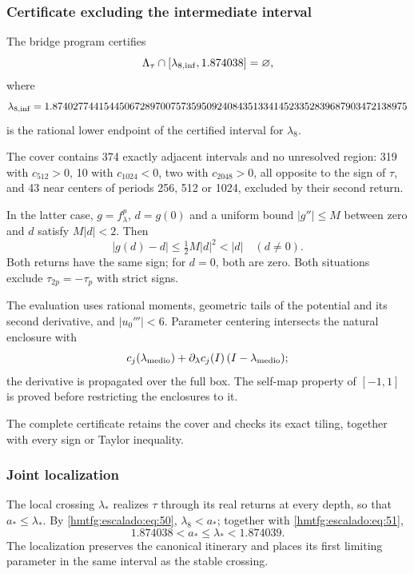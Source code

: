 \subsubsection{Certificate excluding the intermediate interval}
\label{hmtfg:escalado:15.3}

The bridge program certifies
\begin{equation}
\Lambda_\tau\cap[\lambda_{8,\rm inf},1.874038]=\varnothing,
\label{hmtfg:escalado:eq:51}
\end{equation}
where
\[
\lambda_{8,\rm inf}
=1.874027744154450672897007573595092408435133414523352839687903472138975
\]
is the rational lower endpoint of the certified interval for \(\lambda_8\).

The cover contains 374 exactly adjacent intervals and no unresolved region: 319 with \(c_{512}>0\), 10 with \(c_{1024}<0\), two with \(c_{2048}>0\), all opposite to the sign of \(\tau\), and 43 near centers of periods 256, 512 or 1024, excluded by their second return.

In the latter case, \(g=f_\lambda^p\), \(d=g(0)\) and a uniform bound \(|g''|\le M\) between zero and \(d\) satisfy \(M|d|<2\). Then
\[
|g(d)-d|\le\tfrac12M|d|^2<|d|\quad(d\ne0).
\]
Both returns have the same sign; for \(d=0\), both are zero. Both situations exclude \(\tau_{2p}=-\tau_p\) with strict signs.

The evaluation uses rational moments, geometric tails of the potential and its second derivative, and \(|u_0'''|<6\). Parameter centering intersects the natural enclosure with
\[
c_j(\lambda_{\rm medio})+
\partial_\lambda c_j(I)\,(I-\lambda_{\rm medio});
\]
the derivative is propagated over the full box. The self-map property of \([-1,1]\) is proved before restricting the enclosures to it.

The complete certificate retains the cover and checks its exact tiling, together with every sign or Taylor inequality.

\subsubsection{Joint localization}
\label{hmtfg:escalado:15.4}

The local crossing \(\lambda_*\) realizes \(\tau\) through its real returns at every depth, so that \(a_*\le\lambda_*\). By \eqref{hmtfg:escalado:eq:50}, \(\lambda_8<a_*\); together with \eqref{hmtfg:escalado:eq:51},
\begin{equation}
\boxed{1.874038<a_*\le\lambda_*<1.874039.}
\label{hmtfg:escalado:eq:52}
\end{equation}
The localization preserves the canonical itinerary and places its first limiting parameter in the same interval as the stable crossing.

